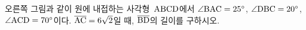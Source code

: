 \noindent\begin{minipage}[t]{0.58\linewidth}\vspace{0pt}\raggedright 오른쪽 그림과 같이 원에 내접하는 사각형~$\mathrm{ABCD}$에서 $\angle\mathrm{BAC}=25^\circ$, $\angle\mathrm{DBC}=20^\circ$, $\angle\mathrm{ACD}=70^\circ$이다. $\overline{\mathrm{AC}}=6\sqrt{2}$일 때, $\overline{\mathrm{BD}}$의 길이를 구하시오.\end{minipage}\hfill\begin{minipage}[t]{0.4\linewidth}\vspace{0pt}\centering \resizebox{\ifdim\width>\linewidth\linewidth\else\width\fi}{!}{}\end{minipage}\par
